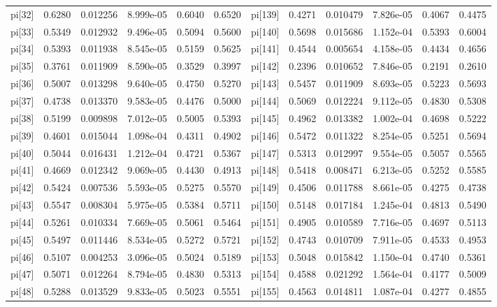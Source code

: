 \documentclass[12pt]{article}
\begin{document}
\begin{table}[h!]
\begin{tabular}{|llllll|llllll|}
pi[32] & 0.6280 & 0.012256   & 8.999e-05 & 0.6040 &0.6520 & pi[139] & 0.4271 & 0.010479   & 7.826e-05 &0.4067 &0.4475 \\
pi[33] & 0.5349 & 0.012932   & 9.496e-05 & 0.5094 &0.5600 & pi[140] & 0.5698 & 0.015686   & 1.152e-04 & 0.5393 &0.6004 \\
pi[34] & 0.5393 & 0.011938   & 8.545e-05 & 0.5159 &0.5625 & pi[141] & 0.4544 & 0.005654   & 4.158e-05 & 0.4434 &0.4656 \\
pi[35] & 0.3761 & 0.011909   & 8.590e-05 & 0.3529 &0.3997 & pi[142] & 0.2396 & 0.010652  & 7.846e-05 & 0.2191 &0.2610 \\
pi[36] & 0.5007 & 0.013298   & 9.640e-05 & 0.4750 &0.5270 & pi[143] & 0.5457 & 0.011909  & 8.693e-05 & 0.5223 &0.5693 \\
pi[37] & 0.4738 & 0.013370   & 9.583e-05 & 0.4476 &0.5000 & pi[144] & 0.5069 & 0.012224  & 9.112e-05 & 0.4830 &0.5308 \\
pi[38] & 0.5199 & 0.009898   & 7.012e-05 & 0.5005 &0.5393 & pi[145] & 0.4962 & 0.013382  & 1.002e-04 & 0.4698 &0.5222 \\
pi[39] & 0.4601 & 0.015044   & 1.098e-04 & 0.4311 &0.4902 & pi[146] & 0.5472 & 0.011322  & 8.254e-05 & 0.5251 &0.5694 \\
pi[40] & 0.5044 & 0.016431   & 1.212e-04 & 0.4721 &0.5367 & pi[147] & 0.5313 & 0.012997  & 9.554e-05 & 0.5057 &0.5565 \\
pi[41] & 0.4669 & 0.012342   & 9.069e-05 & 0.4430 &0.4913 & pi[148] & 0.5418 & 0.008471 & 6.213e-05 & 0.5252 &0.5585 \\
pi[42] & 0.5424 & 0.007536   & 5.593e-05 & 0.5275 &0.5570 & pi[149] & 0.4506 & 0.011788  & 8.661e-05 & 0.4275 &0.4738 \\
pi[43] & 0.5547 & 0.008304   & 5.975e-05 & 0.5384 &0.5711 & pi[150] & 0.5148 & 0.017184  & 1.245e-04 & 0.4813 &0.5490 \\
pi[44] & 0.5261 & 0.010334   & 7.669e-05 & 0.5061 &0.5464 & pi[151] & 0.4905 & 0.010589  & 7.716e-05 & 0.4697 &0.5113 \\
pi[45] & 0.5497 & 0.011446   & 8.534e-05 & 0.5272 &0.5721 & pi[152] & 0.4743 & 0.010709  & 7.911e-05 & 0.4533 &0.4953 \\
pi[46] & 0.5107 & 0.004253   & 3.096e-05 & 0.5024 &0.5189 & pi[153] & 0.5048 & 0.015842  & 1.150e-04 & 0.4740 &0.5361 \\
pi[47] & 0.5071 & 0.012264   & 8.794e-05 & 0.4830 &0.5313 & pi[154] & 0.4588 & 0.021292 & 1.564e-04 & 0.4177 &0.5009 \\
pi[48] & 0.5288 & 0.013529   & 9.833e-05 & 0.5023 &0.5551 & pi[155] & 0.4563 & 0.014811  & 1.087e-04 & 0.4277 &0.4855 \\

\end{tabular}
\end{table}
\end{document}
